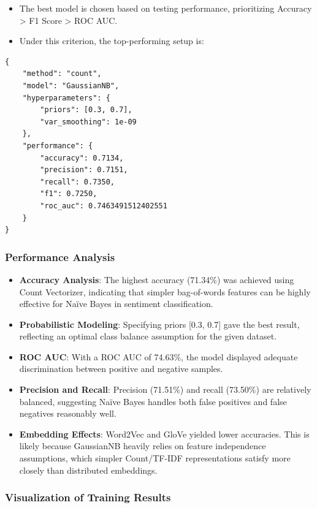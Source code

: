 \begin{itemize}
    \item The best model is chosen based on testing performance, prioritizing Accuracy > F1 Score > ROC AUC.
    \item Under this criterion, the top-performing setup is:
\end{itemize}

\begin{verbatim}
{
    "method": "count",
    "model": "GaussianNB",
    "hyperparameters": {
        "priors": [0.3, 0.7],
        "var_smoothing": 1e-09
    },
    "performance": {
        "accuracy": 0.7134,
        "precision": 0.7151,
        "recall": 0.7350,
        "f1": 0.7250,
        "roc_auc": 0.7463491512402551
    }
}
\end{verbatim}

\subsubsection{Performance Analysis}

\begin{itemize}
    \item \textbf{Accuracy Analysis}: The highest accuracy (71.34\%) was achieved using Count Vectorizer, indicating that simpler bag-of-words features can be highly effective for Naïve Bayes in sentiment classification.
    \item \textbf{Probabilistic Modeling}: Specifying priors [0.3, 0.7] gave the best result, reflecting an optimal class balance assumption for the given dataset.
    \item \textbf{ROC AUC}: With a ROC AUC of 74.63\%, the model displayed adequate discrimination between positive and negative samples.
    \item \textbf{Precision and Recall}: Precision (71.51\%) and recall (73.50\%) are relatively balanced, suggesting Naïve Bayes handles both false positives and false negatives reasonably well.
    \item \textbf{Embedding Effects}: Word2Vec and GloVe yielded lower accuracies. This is likely because GaussianNB heavily relies on feature independence assumptions, which simpler Count/TF-IDF representations satisfy more closely than distributed embeddings.
\end{itemize}

\subsubsection{Visualization of Training Results}

